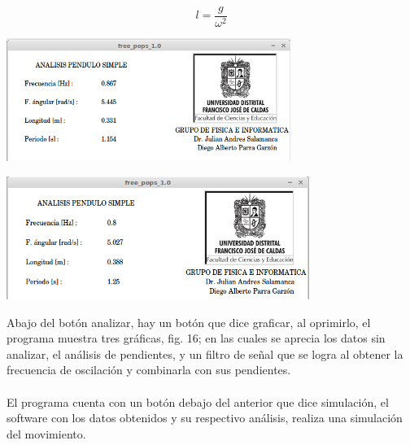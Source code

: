 \documentclass[12pt]{article}
\newenvironment{Figure}
{\par\medskip\noindent\minipage{\linewidth}}
{\endminipage\par\medskip}
\begin{document}
\begin{multicols}{2}
\begin{equation}
\label{eqn:longitud}
 l = \frac{g}{\omega^2}  
\end{equation}

\begin{Figure}
\center
\includegraphics[width=9.cm, height=4cm]{fig/analis1.png}
\label{fig:g14}
\end{Figure}

\begin{Figure}
\center
\includegraphics[width=9.cm, height=4cm]{fig/analis2.png}
\label{fig:g15}
\end{Figure}

Abajo del botón analizar, hay un botón que dice graficar, al oprimirlo, el programa muestra tres gráficas, fig. 16; en las cuales se aprecia los datos sin analizar, el análisis de pendientes, y un filtro de señal que se logra al obtener la frecuencia de oscilación y combinarla con sus  pendientes. 
\\ \\
El programa cuenta con un botón debajo del anterior que dice simulación, el software con los datos obtenidos y su respectivo análisis, realiza una simulación\cite{VISUAL}  del movimiento.


\end{multicols}
\end{document}
